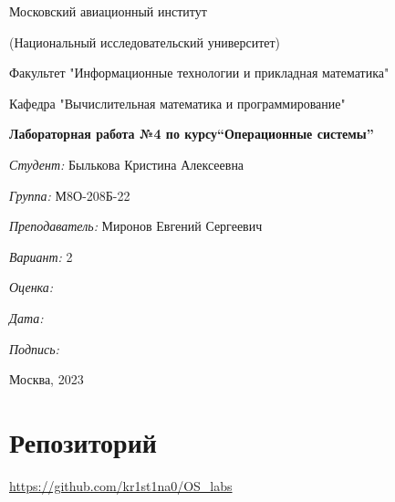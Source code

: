 \documentclass[a4paper, 12pt]{article}
\begin{document}
\thispagestyle{empty}	
\begin{center}
	Московский авиационный институт
	
	(Национальный исследовательский университет)
	
	Факультет "Информационные технологии и прикладная математика"
	
	Кафедра "Вычислительная математика и программирование"
	
\end{center}
\vspace{40ex}
\begin{center}
	\textbf{\large{Лабораторная работа №4 по курсу\linebreak \textquotedblleft Операционные системы\textquotedblright}}
\end{center}
\vspace{35ex}
\begin{flushright}
	\textit{Студент: } Былькова Кристина Алексеевна
	
	\vspace{2ex}
	\textit{Группа: } М8О-208Б-22
	
	\vspace{2ex}
	\textit{Преподаватель: } Миронов Евгений Сергеевич
	
	\vspace{2ex}
	\textit{Вариант: } 2 
	
	\vspace{2ex}
	\textit{Оценка: } \underline{\quad\quad\quad\quad\quad\quad}
	
	 \vspace{2ex}
	\textit{Дата: } \underline{\quad\quad\quad\quad\quad\quad}
	
	\vspace{2ex}
	\textit{Подпись: } \underline{\quad\quad\quad\quad\quad\quad}
	
\end{flushright}

\vspace{5ex}

\begin{vfill}
	\begin{center}
		Москва, 2023
	\end{center}	
\end{vfill}
\newpage

\begingroup
\color{black}
\tableofcontents\newpage
\endgroup

\section{Репозиторий}
\href{https://github.com/kr1st1na0/OS\_labs}{https://github.com/kr1st1na0/OS\_labs}
\end{document}
